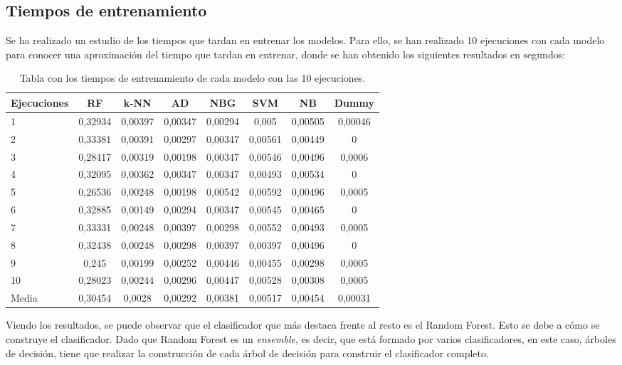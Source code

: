 \subsection{Tiempos de entrenamiento}
Se ha realizado un estudio de los tiempos que tardan en entrenar los modelos. Para ello, se han realizado 10 ejecuciones con cada modelo para conocer una aproximación del tiempo que tardan en entrenar, donde se han obtenido los siguientes resultados en segundos:

\begin{table}[h]
	\begin{center}
		\begin{tabular}{ l c c c c c c c }
			\toprule
			\textbf{Ejecuciones} & \textbf{RF} & \textbf{k-NN} & \textbf{AD} & \textbf{NBG} & \textbf{SVM} & \textbf{NB} & \textbf{Dummy} \\ \midrule
			1 & 0,32934 & 0,00397 & 0,00347 & 0,00294 & 0,005 & 0,00505 & 0,00046 \\
			2 & 0,33381 & 0,00391 & 0,00297 & 0,00347 & 0,00561 & 0,00449 & 0 \\ 
			3 & 0,28417 & 0,00319 & 0,00198 & 0,00347 & 0,00546 & 0,00496 & 0,0006 \\
			4 & 0,32095 & 0,00362 & 0,00347 & 0,00347 & 0,00493 & 0,00534 & 0 \\
			5 & 0,26536 & 0,00248 & 0,00198 & 0,00542 & 0,00592 & 0,00496 & 0,0005 \\
			6 & 0,32885 & 0,00149 & 0,00294 & 0,00347 & 0,00545 & 0,00465 & 0 \\
			7 & 0,33331 & 0,00248 & 0,00397 & 0,00298 & 0,00552 & 0,00493 & 0,0005 \\
			8 & 0,32438 & 0,00248 & 0,00298 & 0,00397 & 0,00397 & 0,00496 & 0 \\
			9 & 0,245 & 0,00199 & 0,00252 & 0,00446 & 0,00455 & 0,00298 & 0,0005 \\
			10 & 0,28023 & 0,00244 & 0,00296 & 0,00447 & 0,00528 & 0,00308 & 0,0005 \\ \midrule
			Media & 0,30454 & 0,0028 & 0,00292 & 0,00381 & 0,00517 & 0,00454 & 0,00031 \\ \bottomrule
		\end{tabular}
		\caption{Tabla con los tiempos de entrenamiento de cada modelo con las 10 ejecuciones.}
		\label{tab:tiempos_entrenamiento}
	\end{center}
\end{table}

Viendo los resultados, se puede observar que el clasificador que más destaca frente al resto es el Random Forest. Esto se debe a cómo se construye el clasificador. Dado que Random Forest es un \textit{ensemble}, es decir, que está formado por varios clasificadores, en este caso, árboles de decisión, tiene que realizar la construcción de cada árbol de decisión para construir el clasificador completo. 

